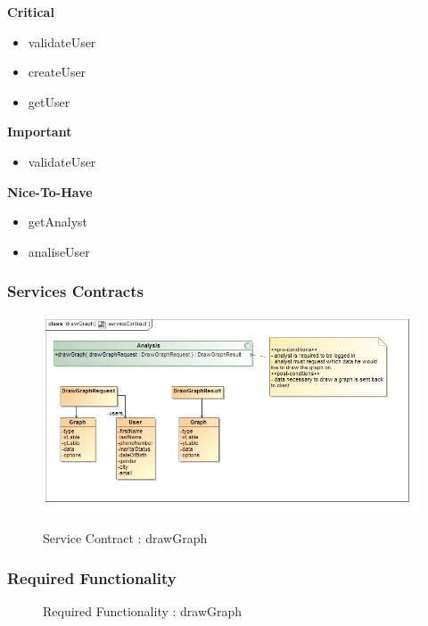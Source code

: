 \documentclass{article}
\begin{document}
		\begin{flushleft}
			\textbf{Critical}
				\begin{itemize}
					\item validateUser
					\item createUser
					\item getUser
				\end{itemize}
			\textbf{Important}
				\begin{itemize}
					\item validateUser
				\end{itemize}

			\textbf{Nice-To-Have}
				\begin{itemize}
					\item getAnalyst
					\item analiseUser
				\end{itemize}
		\end{flushleft}

		\subsubsection{Services Contracts}

		\begin{figure}[H]
		\includegraphics[width=\textwidth]{images/class__drawGraph__serviceContract.jpg}  \\
		\caption{Service Contract : drawGraph}
		\end{figure}

		\subsubsection{Required Functionality}

		\begin{figure}[H]
		\caption{Required Functionality : drawGraph}
		\end{figure}
\end{document}
